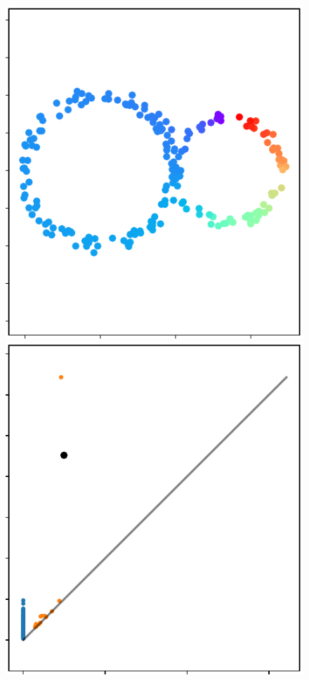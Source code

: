 \begin{figure}[htbp]
  \includegraphics[scale=0.8]{figures/circular_coords2.pdf}
  \includegraphics[scale=0.8]{figures/circular_dgm2.pdf}
   \caption{}
   \label{fig:circular}
\end{figure}

